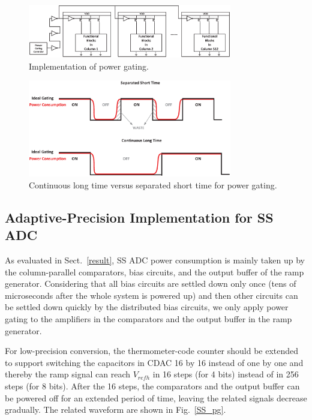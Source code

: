 \begin{figure}[htbp]
	\centerline{\includegraphics[width=3.5in]{./Figures/GATING.eps}}
	\caption{Implementation of power gating.}
	\label{GATING}
\end{figure} 

\begin{figure}[htbp]
	\centerline{\includegraphics[width=3.5in]{./Figures/TIME.eps}}
	\caption{Continuous long time versus separated short time for power gating.}
	\label{TIME}
\end{figure}  

\subsection{Adaptive-Precision Implementation for SS ADC}\label{gating2}

As evaluated in Sect.~\ref{result}, SS ADC power consumption is mainly taken up by the column-parallel comparators, bias circuits, and the output buffer of the ramp generator. 
Considering that all bias circuits are settled down only once (tens of microseconds after the whole system is powered up) and then other circuits can be settled down quickly by the distributed 
bias circuits, we only apply power gating to the amplifiers in the comparators and the output buffer in the ramp generator.

For low-precision conversion, the thermometer-code counter should be extended to support switching the capacitors in CDAC 16 by 16 instead of one by one and thereby the ramp signal can reach $V_{refh}$ in 16 steps (for 4 bits) instead of in 256 steps (for 8 bits). 
After the 16 steps, the comparators and the output buffer can be powered off for an extended period of time, leaving the related signals decrease gradually.
The related waveform are shown in Fig.~\ref{SS_pg}. 

